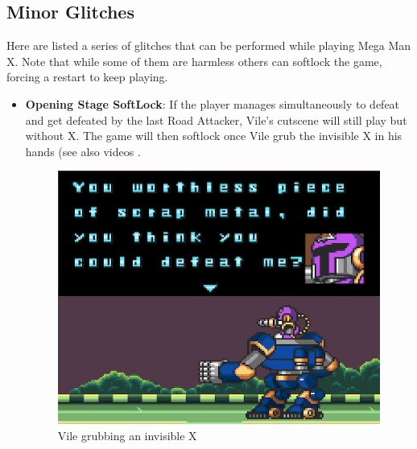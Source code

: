 \subsection{Minor Glitches}
Here are listed a series of glitches that can be performed while playing Mega Man X. Note that while some of them are harmless others can softlock the game, forcing a restart to keep playing.
\begin{itemize}
	\item \textbf{Opening Stage SoftLock}: If the player manages simultaneously to defeat and get defeated by the last Road Attacker, Vile's cutscene will still play but without X. The game will then softlock once Vile grub the invisible X in his hands (see also videos .
	\begin{figure}[htp]
		\centering
		\includegraphics[width=0.5\linewidth]{figures/X1/Miscs/Intro_softlock.jpg}
		\caption{Vile grubbing an invisible X}
	\end{figure}
	

\end{itemize}
